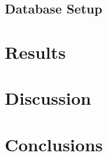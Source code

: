 \subsection{Database Setup}
\label{sec:database-setup}

\section{Results}
\label{sec:results}

\section{Discussion}
\label{sec:discussion}

\section{Conclusions}
\label{sec:conclusions}
